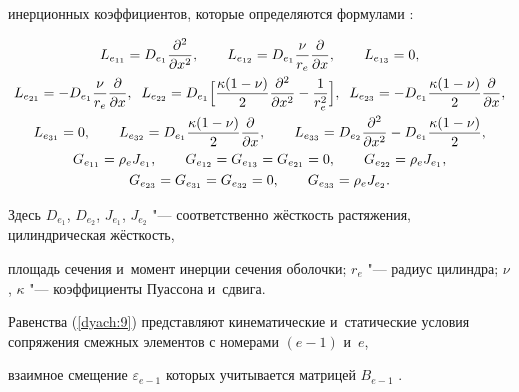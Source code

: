 инерционных коэффициентов, которые определяются формулами \cite{dyach:bib:Grid}:

\begin{gather}\notag

L_{e_{11}}=D_{e_1}\frac{\partial^{2}}{\partial x^{2}}, \qquad L_{e_{12}}=D_{e_1}\frac{\nu}{r_{e}}\frac{\partial}{\partial x}, \qquad L_{e_{13}}=0,\\

\notag

L_{e_{21}}=-D_{e_1}\frac{\nu}{r_{e}}\frac{\partial}{\partial x}, \; \; L_{e_{22}}=D_{e_1}\Bigl[\frac{\kappa(1-\nu)}{2}\frac{\partial^{2}}{\partial x^{2}}-\frac{1}{r_{e}^{2}}\Bigr],\; \; 

L_{e_{23}}=-D_{e_1}\frac{\kappa(1-\nu)}{2}\frac{\partial}{\partial x}, \notag \\

L_{e_{31}}=0,\qquad  L_{e_{32}}=D_{e_1}\frac{\kappa(1-\nu)}{2}\frac{\partial}{\partial x}, \qquad L_{e_{33}}=D_{e_2}\frac{\partial^{2}}{\partial x^{2}}-D_{e_1}\frac{\kappa(1-\nu)}{2}, \notag\\

G_{e_{11}}=\rho_{e}J_{e_1}, \qquad G_{e_{12}}=G_{e_{13}}=G_{e_{21}}=0, \qquad G_{e_{22}}=\rho_{e}J_{e_1}, \notag\\

\notag

G_{e_{23}}=G_{e_{31}}=G_{e_{32}}=0, \qquad G_{e_{33}}=\rho_{e}J_{e_2}.

\end{gather}

Здесь $D_{e_1}$, $D_{e_2}$, $J_{e_1}$, $J_{e_2}$ "--- соответственно жёсткость растяжения, цилиндрическая жёсткость,

площадь сечения и~момент инерции сечения оболочки; $r_e$ "--- радиус цилиндра; $\nu$, $\kappa$ "--- коэффициенты Пуассона и~сдвига.



Равенства (\ref{dyach:9}) представляют кинематические и~статические условия сопряжения смежных элементов с номерами $(e-1)$ и~$e$,

взаимное смещение $\varepsilon_{e-1}$ которых учитывается матрицей $B_{e-1}$ \cite{dyach:bib:Elen, dyach:bib:Dyach}.






